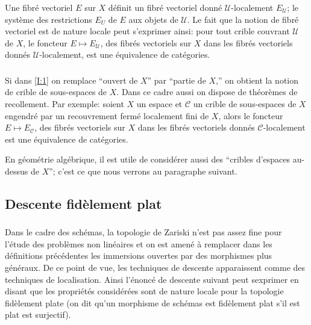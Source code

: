 \documentclass{book}
\newcommand{\sC}{\mathscr{C}}
\newcommand{\sU}{\mathscr{U}}
\begin{document}
\subsubsection{}\label{I:1-3-3}

Une fibré vectoriel $E$ sur $X$ définit un fibré vectoriel donné 
$\sU$-localement $E_\sU$; le système des restrictions $E_U$ de $E$ aux objets 
de $\sU$. Le fait que la notion de fibré vectoriel est de nature locale peut 
s'exprimer ainsi: pour tout crible couvrant $\sU$ de $X$, le foncteur 
$E\mapsto E_\sU$, des fibrés vectoriels sur $X$ dans les fibrés vectoriels 
donnés $\sU$-localement, est une équivalence de catégories. 





\subsubsection{}\label{I:1-3-4}

Si dans \ref{I:1} on remplace ``ouvert de $X$'' par ``partie de 
$X$,'' on obtient la notion de crible de sous-espaces de $X$. Dans ce cadre 
aussi on dispose de théorèmes de recollement. Par exemple: soient $X$ un 
espace et $\sC$ un crible de sous-espaces de $X$ engendré par un recouvrement 
fermé localement fini de $X$, alors le foncteur $E\mapsto E_\sC$, des fibrés 
vectoriels sur $X$ dans les fibrés vectoriels donnés $\sC$-localement est une 
équivalence de catégories. 

En géométrie algébrique, il est utile de considérer aussi des ``cribles 
d'espaces au-dessus de $X$''; c'est ce que nous verrons au paragraphe suivant. 










\subsection{Descente fidèlement plat}\label{I:1-4}





\subsubsection{}\label{I:1-4-1}

Dans le cadre des schémas, la topologie de Zariski n'est pas assez fine pour 
l'étude des problèmes non linéaires et on est amené à remplacer dans les 
définitions précédentes les immersions ouvertes par des morphismes plus 
généraux. De ce point de vue, les techniques de descente apparaissent comme des 
techniques de localisation. Ainsi l'énoncé de descente suivant peut sexprimer 
en disant que les propriétés considérées sont de nature locale pour la 
topologie fidèlement plate (on dit qu'un morphisme de schémas est fidèlement 
plat s'il est plat est surjectif). 
\end{document}
